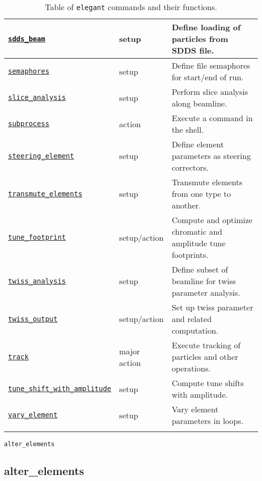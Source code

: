 \documentclass[11pt]{article}
\begin{document}
\begin{longtable}{|p{2.75in}|p{0.75in}|p{2.75in}|}
\hyperref[subsec:sddsbeam]{\tt sdds\_beam} & setup & Define loading of particles from SDDS file. \\ \hline
\hyperref[subsec:semaphores]{\tt semaphores} & setup & Define file semaphores for start/end of run. \\ \hline
\hyperref[subsec:sliceanalysis]{\tt slice\_analysis} & setup & Perform slice analysis along beamline. \\ \hline
\hyperref[subsec:subprocess]{\tt subprocess} & action & Execute a command in the shell. \\ \hline
\hyperref[subsec:steeringelement]{\tt steering\_element} & setup & Define element parameters as steering correctors. \\ \hline
\hyperref[subsec:transmuteelements]{\tt transmute\_elements} & setup & Transmute elements from one type to another. \\ \hline
\hyperref[subsec:tunefootprint]{\tt tune\_footprint} & setup/action & Compute and optimize chromatic and amplitude tune footprints. \\ \hline
\hyperref[subsec:twissanalysis]{\tt twiss\_analysis} & setup & Define subset of beamline for twiss parameter analysis. \\ \hline
\hyperref[subsec:twissoutput]{\tt twiss\_output} & setup/action & Set up twiss parameter and related computation. \\ \hline
\hyperref[subsec:track]{\tt track} & major action & Execute tracking of particles and other operations. \\ \hline
\hyperref[subsec:tuneshiftwithamplitude]{\tt tune\_shift\_with\_amplitude} & setup & Compute tune shifts with amplitude. \\ \hline
\hyperref[subsec:varyelement]{\tt vary\_element} & setup & Vary element parameters in loops. \\ \hline
\caption{Table of {\tt elegant} commands and their functions.}
\end{longtable}

\clearpage

\newpage
\begin{center}{\Large\verb|alter_elements|}\end{center}
\subsection{alter\_elements\label{subsec:alterelements}}
\end{document}
